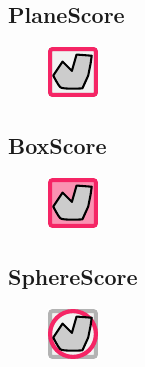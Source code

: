 \documentclass{ol-softwaremanual}
\begin{document}
\subsection{PlaneScore}
\begin{figure}[h]
    \centering
    \includegraphics[width = .5\textwidth]{figures/Icons/PLANESCORE.pdf}
\end{figure}

\subsection{BoxScore}
\begin{figure}[h]
    \centering
    \includegraphics[width = .5\textwidth]{figures/Icons/BOXSCORE.pdf}
\end{figure}

\subsection{SphereScore}
\begin{figure}[h]
    \centering
    \includegraphics[width = .5\textwidth]{figures/Icons/SPHERESCORE.pdf}
\end{figure}
\end{document}
